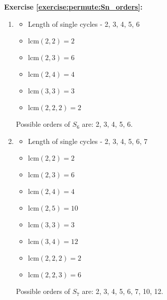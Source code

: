 \noindent\textbf{Exercise \ref{exercise:permute:Sn_orders}:}
\begin{enumerate}[{a.}]
\item
	\begin{multicols}{2}
	\begin{itemize}
	\item
	Length of single cycles - 2, 3, 4, 5, 6
	
	\item
	$\mbox{lcm}(2, 2) = 2$
	
	\item
	$\mbox{lcm}(2, 3) = 6$
	
	\item
	$\mbox{lcm}(2, 4) = 4$
	
	\item
	$\mbox{lcm}(3, 3) = 3$
	
	\item
	$\mbox{lcm}(2, 2, 2) = 2$
	\end{itemize}
	\end{multicols}
Possible orders of $S_6$ are: 2, 3, 4, 5, 6.
	
\item
	\begin{multicols}{2}
	\begin{itemize}
	\item
	Length of single cycles - 2, 3, 4, 5, 6, 7
	
	\item
	$\mbox{lcm}(2, 2) = 2$
	
	\item
	$\mbox{lcm}(2, 3) = 6$
	
	\item
	$\mbox{lcm}(2, 4) = 4$
	
	\item
	$\mbox{lcm}(2, 5) = 10$
	
	\item
	$\mbox{lcm}(3, 3) = 3$
	
	\item
	$\mbox{lcm}(3, 4) = 12$
	
	\item
	$\mbox{lcm}(2, 2, 2) = 2$
	
	\item
	$\mbox{lcm}(2, 2, 3) = 6$
	\end{itemize}
	\end{multicols}
Possible orders of $S_7$ are: 2, 3, 4, 5, 6, 7, 10, 12.
\end{enumerate}

